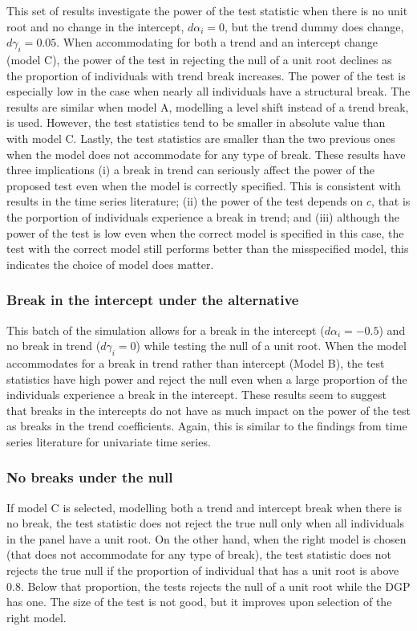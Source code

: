 \documentclass[a4paper,fleqn]{article} %
\begin{document}
This set of results investigate the power of the test statistic when there is no unit root and no change in the intercept, $d\alpha_{i}=0$, but the trend dummy does change, $d\gamma_i=0.05$. When accommodating for both a trend and an intercept change (model C), the power of the test in rejecting the null of a unit root declines as the proportion of individuals with trend break increases. The power of the test is especially low in the case when nearly all individuals have a structural break. The results are similar when model A, modelling a level shift instead of a trend break, is used. However, the test statistics tend to be smaller in absolute value than with model C. Lastly, the test statistics are smaller than the two previous ones when the model does not accommodate for any type of break. These results have three implications (i) a break in trend can seriously affect the power of the proposed test even when the model is correctly specified. This is consistent with results in the time series literature; (ii) the power of the test depends on $c$, that is the porportion of individuals experience a break in trend; and (iii) although the power of the test is low even when the correct model is specified in this case, the test with the correct model still performs better than the misspecified model, this indicates the choice of model does matter.

\subsubsection{Break in the intercept under the alternative}
This batch of the simulation allows for a break in the intercept ($d\alpha_i=-0.5$) and no break in trend ($d\gamma_i=0$) while testing the null of a unit root. When the model accommodates for a break in trend rather than intercept (Model B), the test statistics have high power and reject the null even when a large proportion of the individuals experience a break in the intercept. These results seem to suggest that breaks in the intercepts do not have as much impact on the power of the test as breaks in the trend coefficients. Again, this is similar to the findings from time series literature for univariate time series.

\subsubsection{No breaks under the null}
If model C is selected, modelling both a trend and intercept break when there is no break, the test statistic does not reject the true null only when all individuals in the panel have a unit root. On the other hand, when the right model is chosen (that does not accommodate for any type of break), the test statistic does not rejects the true null if the proportion of individual that has a unit root is above $0.8$. Below that proportion, the tests rejects the null of a unit root while the DGP has one. The size of the test is not good, but it improves upon selection of the right model.
\end{document}

